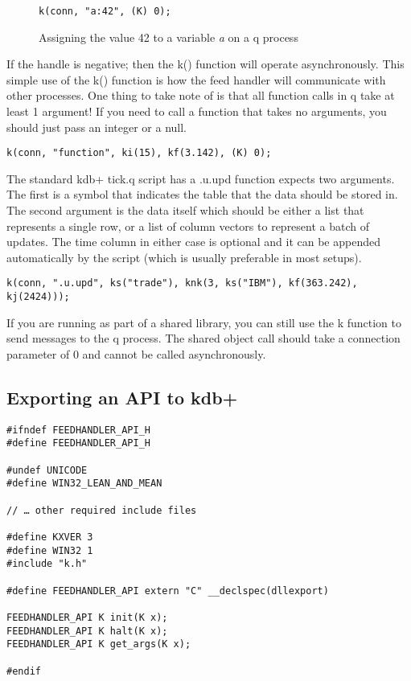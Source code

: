 \begin{figure}
\begin{lstlisting}
k(conn, "a:42", (K) 0);
\end{lstlisting}
\caption{Assigning the value 42 to a variable \textit{a} on a q process}
\end{figure}

If the handle is negative; then the k() function will operate asynchronously. This simple use of the k() 
function is how the feed handler will communicate with other processes. One thing to take note of is that
all function calls in q take at least 1 argument! If you need to call a function that takes no arguments,
you should just pass an integer or a null.

\begin{lstlisting}
k(conn, "function", ki(15), kf(3.142), (K) 0);
\end{lstlisting}

The standard kdb+ tick.q script has a .u.upd function expects two arguments. The first is a symbol that
indicates the table that the data should be stored in. The second argument is the data itself which should
be either a list that represents a single row, or a list of column vectors to represent a batch of updates.
The time column in either case is optional and it can be appended automatically by the script (which is
usually preferable in most setups).

\begin{lstlisting}
k(conn, ".u.upd", ks("trade"), knk(3, ks("IBM"), kf(363.242), kj(2424)));
\end{lstlisting}

If you are running as part of a shared library, you can still use the k function to send messages to the q
process. The shared object call should take a connection parameter of 0 and cannot be called asynchronously.

\subsection{Exporting an API to kdb+}

\begin{lstlisting}
#ifndef FEEDHANDLER_API_H
#define FEEDHANDLER_API_H

#undef UNICODE
#define WIN32_LEAN_AND_MEAN

// … other required include files

#define KXVER 3
#define WIN32 1
#include "k.h"

#define FEEDHANDLER_API extern "C" __declspec(dllexport)

FEEDHANDLER_API K init(K x);
FEEDHANDLER_API K halt(K x);
FEEDHANDLER_API K get_args(K x);

#endif
\end{lstlisting}


